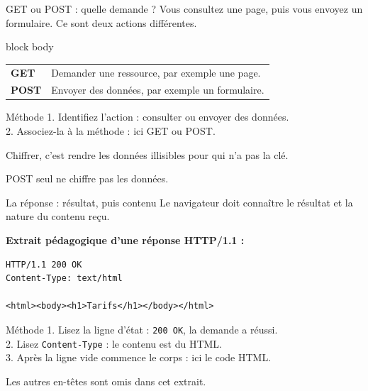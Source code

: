 \documentclass[aspectratio=169,11pt]{beamer}
\begin{document}
\begin{frame}{GET ou POST : quelle demande ?}
  Vous consultez une page, puis vous envoyez un formulaire.
  Ce sont deux actions différentes.
  \begin{beamercolorbox}[sep=10pt]{block body}
  \renewcommand{\arraystretch}{1.7}
  \begin{tabular}{ll}
    \textbf{GET} & Demander une ressource, par exemple une page.\\
    \textbf{POST} & Envoyer des données, par exemple un formulaire.\\
  \end{tabular}
  \end{beamercolorbox}
  \begin{block}{Méthode}
    1. Identifiez l'action : consulter ou envoyer des données.\\
    2. Associez-la à la méthode : ici GET ou POST.
  \end{block}
  \small Chiffrer, c'est rendre les données illisibles pour qui n'a pas la clé.\par
  POST seul ne chiffre pas les données.
\end{frame}

\begin{frame}[fragile]{La réponse : résultat, puis contenu}
  Le navigateur doit connaître le résultat et la nature du contenu reçu.\par
  \textbf{Extrait pédagogique d'une réponse HTTP/1.1 :}
  \begin{lstlisting}[style=webcode,language={}]
HTTP/1.1 200 OK
Content-Type: text/html

<html><body><h1>Tarifs</h1></body></html>
\end{lstlisting}
  \begin{block}{Méthode}
    1. Lisez la ligne d'état : \texttt{200 OK}, la demande a réussi.\\
    2. Lisez \texttt{Content-Type} : le contenu est du HTML.\\
    3. Après la ligne vide commence le corps : ici le code HTML.
  \end{block}
  \small Les autres en-têtes sont omis dans cet extrait.
\end{frame}
\end{document}
